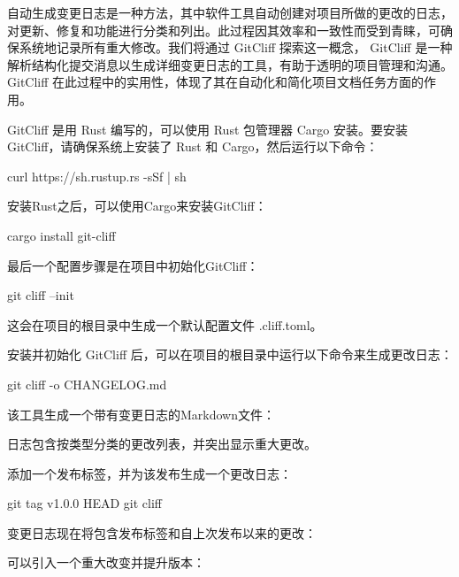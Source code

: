 
自动生成变更日志是一种方法，其中软件工具自动创建对项目所做的更改的日志，对更新、修复和功能进行分类和列出。此过程因其效率和一致性而受到青睐，可确保系统地记录所有重大修改。我们将通过 GitCliff 探索这一概念， GitCliff 是一种解析结构化提交消息以生成详细变更日志的工具，有助于透明的项目管理和沟通。 GitCliff 在此过程中的实用性，体现了其在自动化和简化项目文档任务方面的作用。


GitCliff 是用 Rust 编写的，可以使用 Rust 包管理器 Cargo 安装。要安装 GitCliff，请确保系统上安装了 Rust 和 Cargo，然后运行以下命令：

\begin{shell}
curl https://sh.rustup.rs -sSf | sh
\end{shell}

安装Rust之后，可以使用Cargo来安装GitCliff：

\begin{shell}
cargo install git-cliff
\end{shell}

最后一个配置步骤是在项目中初始化GitCliff：

\begin{shell}
git cliff --init
\end{shell}

这会在项目的根目录中生成一个默认配置文件 .cliff.toml。


安装并初始化 GitCliff 后，可以在项目的根目录中运行以下命令来生成更改日志：

\begin{shell}
git cliff -o CHANGELOG.md
\end{shell}

该工具生成一个带有变更日志的Markdown文件：


日志包含按类型分类的更改列表，并突出显示重大更改。

添加一个发布标签，并为该发布生成一个更改日志：

\begin{shell}
git tag v1.0.0 HEAD
git cliff
\end{shell}

变更日志现在将包含发布标签和自上次发布以来的更改：


可以引入一个重大改变并提升版本：

